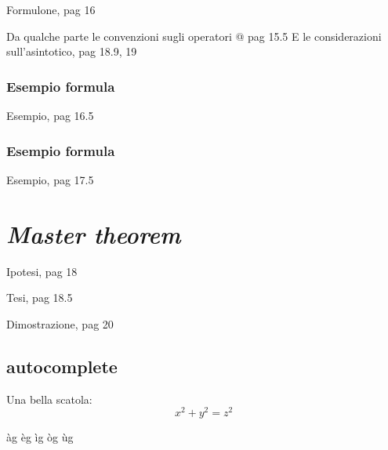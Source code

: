 Formulone, pag 16

Da qualche parte le convenzioni sugli operatori @ pag 15.5
E le considerazioni sull'asintotico, pag 18.9, 19

\subsubsection{Esempio formula}
Esempio, pag 16.5

\subsubsection{Esempio formula}
Esempio, pag 17.5

\section{\textit{Master theorem}}
Ipotesi, pag 18

Tesi, pag 18.5

Dimostrazione, pag 20


\subsection{autocomplete}
Una bella scatola:
\begin{equation}
    \boxed{x^2+y^2 = z^2}
\end{equation}

àg
èg
ìg
òg
ùg

